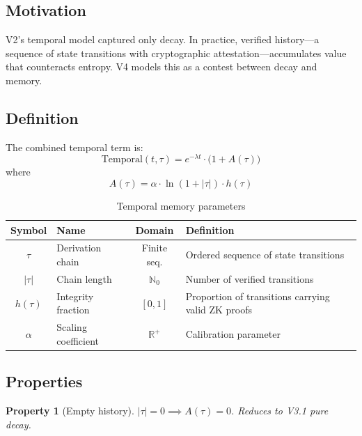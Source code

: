 \documentclass[11pt,a4paper]{article}
\newtheorem{property}{Property}[section]
\begin{document}
\subsection{Motivation}

V2's temporal model captured only decay. In practice, verified history---a sequence of state transitions with cryptographic attestation---accumulates value that counteracts entropy. V4 models this as a contest between decay and memory.

\subsection{Definition}

The combined temporal term is:
\begin{equation}\label{eq:temporal}
\mathrm{Temporal}(t, \tau) = e^{-\lambda t} \cdot \bigl(1 + A(\tau)\bigr)
\end{equation}
where
\begin{equation}\label{eq:memory}
A(\tau) = \alpha \cdot \ln(1 + |\tau|) \cdot h(\tau)
\end{equation}

\begin{table}[h]
\centering
\caption{Temporal memory parameters}
\begin{tabular}{@{}clcL{7cm}@{}}
\toprule
\textbf{Symbol} & \textbf{Name} & \textbf{Domain} & \textbf{Definition} \\
\midrule
$\tau$ & Derivation chain & Finite seq. & Ordered sequence of state transitions \\
$|\tau|$ & Chain length & $\mathbb{N}_0$ & Number of verified transitions \\
$h(\tau)$ & Integrity fraction & $[0,1]$ & Proportion of transitions carrying valid ZK proofs \\
$\alpha$ & Scaling coefficient & $\mathbb{R}^+$ & Calibration parameter \\
\bottomrule
\end{tabular}
\end{table}

\subsection{Properties}

\begin{property}[Empty history]
$|\tau| = 0 \implies A(\tau) = 0$. Reduces to V3.1 pure decay.
\end{property}
\end{document}
